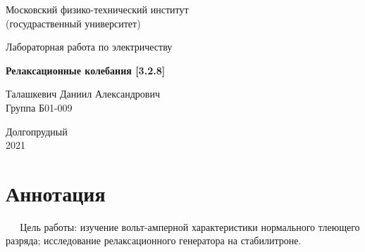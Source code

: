\documentclass[a4paper, 12pt]{article}%
\begin{document}


\begin{titlepage}

	\newpage
	\begin{center}
		\normalsize Московский физико-технический институт \\(госудраственный 			университет)
	\end{center}

	\vspace{6em}

	\begin{center}
		\Large Лабораторная работа по электричеству\\
	\end{center}

	\vspace{1em}

	\begin{center}
		\large \textbf{Релаксационные колебания [3.2.8]}
	\end{center}

	\vspace{2em}

	\begin{center}
		\large Талашкевич Даниил Александрович\\
		Группа Б01-009
	\end{center}

	\vspace{\fill}

	\begin{center}
	Долгопрудный \\2021
	\end{center}
	
\end{titlepage}



	\thispagestyle{empty}
	\newpage
	\tableofcontents
	\newpage
	\setcounter{page}{1}



\section{Аннотация}
 
$\quad\ \ \textbf{Цель работы}$: изучение вольт-амперной характеристики нормального тлеющего разряда; исследование релаксационного генератора на стабилитроне.
\end{document}

